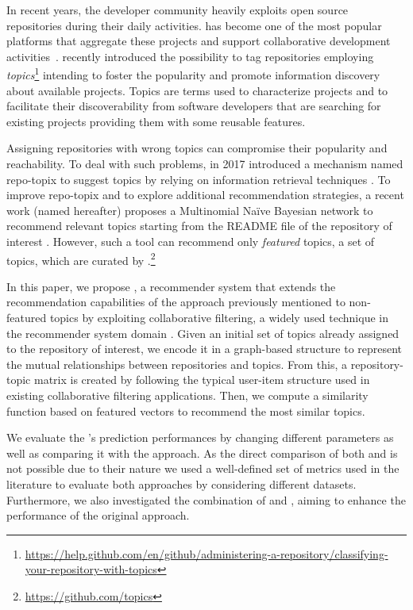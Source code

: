In recent years, the developer community heavily exploits open source 
repositories during their daily activities. \GH has become one of the most
popular platforms that aggregate these projects and support collaborative 
development activities~\cite{7832894}. \GH recently introduced the possibility 
to tag repositories employing 
\emph{topics}\footnote{\url{https://help.github.com/en/github/administering-a-repository/classifying-your-repository-with-topics}}
 intending to foster the popularity and promote information discovery about 
available projects. Topics are terms used to characterize projects and to 
facilitate their discoverability from software developers that are searching 
for existing projects providing them with some reusable features. 

Assigning repositories with wrong topics can compromise their popularity and 
reachability. To deal with such problems, in 2017 \GH introduced a 
mechanism named repo-topix to suggest topics by relying on information 
retrieval techniques \cite{repo-topix}. To improve repo-topix 
and to explore additional recommendation strategies, a recent work (named \MNB
hereafter) proposes a Multinomial Na\"ive Bayesian network to 
recommend relevant topics starting from the README file of the repository of 
interest \cite{10.1145/3383219.3383227}. However, such a tool can recommend 
only \emph{featured} topics, \ie a set of topics, which are curated by 
\GH.\footnote{\url{https://github.com/topics}}


In this paper, we propose \TF, a recommender system that extends the 
recommendation capabilities of the \MNB approach previously mentioned to 
non-featured topics by exploiting collaborative filtering, a widely used 
technique in the recommender system domain 
\cite{Schafer:2007:CFR:1768197.1768208}. Given an initial set of topics already 
assigned to the \GH repository of interest, we encode it in a graph-based 
structure to represent the mutual relationships between repositories and 
topics. From this, a repository-topic matrix is created by following the 
typical user-item structure used in existing collaborative filtering 
applications. Then, we compute a similarity function based on featured vectors 
to recommend the most similar topics.

We evaluate the \TF's prediction performances by changing different parameters 
as well as comparing it with the \MNB approach. As the direct comparison of both \MNB and \TF is not 
possible due to their nature %
we used a well-defined set of metrics used in the literature to evaluate both approaches by 
considering different datasets. Furthermore, we also investigated the combination of \MNB and \TF, aiming to enhance the performance of the original \MNB approach. %

